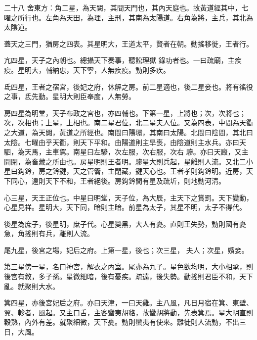 
\begin{pinyinscope}

 二十八
 舍東方：角二星，為天闕，其間天門也，其內天庭也。故黃道經其中，七曜之所行也。左角為天田，為理，主刑，其南為太陽道。右角為將，主兵，其北為太陰道。



 蓋天之三門，猶房之四表。其星明大，王道太平，賢者在朝。動搖移徙，王者行。



 亢四星，天子之內朝也。總攝天下奏事，聽訟理獄
 錄功者也。一曰疏廟，主疾疫。星明大，輔納忠，天下寧，人無疾疫。動則多疾。



 氐四星，王者之宿宮，後妃之府，休解之房。前二星適也，後二星妾也。將有徭役之事，氐先動。星明大則臣奉度，人無勞。



 房四星為明堂，天子布政之宮也，亦四輔也。下第一星，上將也；次，次將也；次，次相也；上星，上相也。南二星君位，北二星夫人位。又為四表，中間為天衢之大道，為天闕，黃道之所經也。南間曰陽環，其南曰太陽。北間曰陰間，其北曰太陰。七曜由乎天衢，則天下平和。由陽道則主旱喪，由陰道則主水兵。亦曰天駟，為天馬，主車駕。南星曰左驂，次左服，次右服，次右
 驂。亦曰天廄，又主開閉，為畜藏之所由也。房星明則王者明。驂星大則兵起，星離則人流。又北二小星曰鉤鈐，房之鈐鍵，天之管籥，主閉藏，鍵天心也。王者孝則鉤鈐明。近房，天下同心，遠則天下不和，王者絕後。房鉤鈐間有星及疏圻，則地動河清。



 心三星，天王正位也。中星曰明堂，天子位，為大辰，主天下之賞罰。天下變動，心星見祥。星明大，天下同，暗則主暗。前星為太子，其星不明，太子不得代。



 後星為庶子，後星明，庶子代。心星變黑，大人有憂。直則王失勢，動則國有憂急，角搖則有兵，離則人流。



 尾九星，後宮之場，妃后之府。上第一星，後也；次三星，
 夫人；次星，嬪妾。



 第三星傍一星，名曰神宮，解衣之內室。尾亦為九子。星色欲均明，大小相承，則後宮有敘，多子孫。星微細暗，後有憂疾。疏遠，後失勢。動搖則君臣不和，天下亂。就聚則大水。



 箕四星，亦後宮妃后之府。亦曰天津，一曰天雞。主八風，凡日月宿在箕、東壁、翼、軫者，風起。又主口舌，主客蠻夷胡貉，故蠻胡將動，先表箕焉。星大明直則穀熟，內外有差。就聚細微，天下憂。動則蠻夷有使來。離徙則人流動，不出三日，大風。




\end{pinyinscope}
